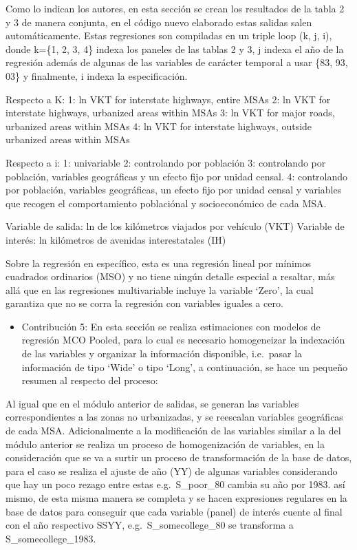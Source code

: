 \documentclass[
]{article}
\providecommand{\tightlist}{%
  \setlength{\itemsep}{0pt}\setlength{\parskip}{0pt}}
\begin{document}
Como lo indican los autores, en esta sección se crean los resultados de
la tabla 2 y 3 de manera conjunta, en el código nuevo elaborado estas
salidas salen automáticamente. Estas regresiones son compiladas en un
triple loop (k, j, i), donde k=\{1, 2, 3, 4\} indexa los paneles de las
tablas 2 y 3, j indexa el año de la regresión además de algunas de las
variables de carácter temporal a usar \{83, 93, 03\} y finalmente, i
indexa la especificación.

Respecto a K: 1: ln VKT for interstate highways, entire MSAs 2: ln VKT
for interstate highways, urbanized areas within MSAs 3: ln VKT for major
roads, urbanized areas within MSAs 4: ln VKT for interstate highways,
outside urbanized areas within MSAs

Respecto a i: 1: univariable 2: controlando por población 3: controlando
por población, variables geográficas y un efecto fijo por unidad censal.
4: controlando por población, variables geográficas, un efecto fijo por
unidad censal y variables que recogen el comportamiento poblaciónal y
socioeconómico de cada MSA.

Variable de salida: ln de los kilómetros viajados por vehículo (VKT)
Variable de interés: ln kilómetros de avenidas interestatales (IH)

Sobre la regresión en específico, esta es una regresión lineal por
mínimos cuadrados ordinarios (MSO) y no tiene ningún detalle especial a
resaltar, más allá que en las regresiones multivariable incluye la
variable `Zero', la cual garantiza que no se corra la regresión con
variables iguales a cero.

\begin{itemize}
\tightlist
\item
  Contribución 5: En esta sección se realiza estimaciones con modelos de
  regresión MCO Pooled, para lo cual es necesario homogeneizar la
  indexación de las variables y organizar la información disponible,
  i.e.~pasar la información de tipo `Wide' o tipo `Long', a
  continuación, se hace un pequeño resumen al respecto del proceso:
\end{itemize}

Al igual que en el módulo anterior de salidas, se generan las variables
correspondientes a las zonas no urbanizadas, y se reescalan variables
geográficas de cada MSA. Adicionalmente a la modificación de las
variables similar a la del módulo anterior se realiza un proceso de
homogenización de variables, en la consideración que se va a surtir un
proceso de transformación de la base de datos, para el caso se realiza
el ajuste de año (YY) de algunas variables considerando que hay un poco
rezago entre estas e.g.~S\_poor\_80 cambia su año por 1983. así mismo,
de esta misma manera se completa y se hacen expresiones regulares en la
base de datos para conseguir que cada variable (panel) de interés cuente
al final con el año respectivo SSYY, e.g.~S\_somecollege\_80 se
transforma a S\_somecollege\_1983.
\end{document}
